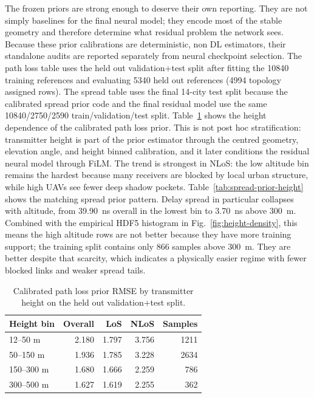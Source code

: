 \documentclass[journal]{IEEEtran}
\begin{document}
The frozen priors are strong enough to deserve their own reporting. They are
not simply baselines for the final neural model; they encode most of the stable
geometry and therefore determine what residual problem the network sees.
Because these prior calibrations are deterministic, non DL estimators, their
standalone audits are reported separately from neural checkpoint selection. The
path loss table uses the held out validation+test split after fitting the
10840 training references and evaluating 5340 held out references
(4994 topology assigned rows). The spread table uses the final 14-city test
split because the calibrated spread prior code and the final residual model use
the same 10840/2750/2590 train/validation/test split.
Table~\ref{tab:pl-prior-height} shows the height dependence of the calibrated
path loss prior. This is not post hoc stratification: transmitter height is part of the
prior estimator through the centred geometry, elevation angle, and
height binned calibration, and it later conditions the residual neural model
through FiLM. The trend is strongest in NLoS: the low altitude bin remains the
hardest because many receivers are blocked by local urban structure, while high
UAVs see fewer deep shadow pockets.
Table~\ref{tab:spread-prior-height} shows the matching spread prior pattern.
Delay spread in particular collapses with altitude, from \SI{39.90}{ns}
overall in the lowest bin to \SI{3.70}{ns} above \SI{300}{m}.
Combined with the empirical HDF5 histogram in Fig.~\ref{fig:height-density},
this means the high altitude rows are not better because they have more
training support; the training split contains only 866 samples above
\SI{300}{m}. They are better despite that scarcity, which indicates a
physically easier regime with fewer blocked links and weaker spread tails.

\begin{table}[!t]
\centering
\caption{Calibrated path loss prior RMSE by transmitter height on the held out
validation+test split.}
\label{tab:pl-prior-height}
\scriptsize
\begin{tabular}{lrrrr}
\toprule
Height bin & Overall & LoS & NLoS & Samples \\
\midrule
12--50 m & 2.180 & 1.797 & 3.756 & 1211 \\
50--150 m & 1.936 & 1.785 & 3.228 & 2634 \\
150--300 m & 1.680 & 1.666 & 2.259 & 786 \\
300--500 m & 1.627 & 1.619 & 2.255 & 362 \\
\bottomrule
\end{tabular}
\end{table}
\end{document}
